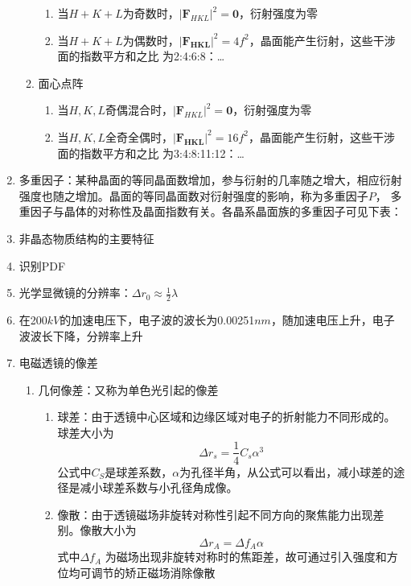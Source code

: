 \documentclass[12pt,a4paper]{article}
\begin{document}
\begin{enumerate}
\begin{enumerate}
\begin{enumerate}
                    \item 当$H+K+L$为奇数时，$\left|\boldsymbol{F}_{H K L}\right|^{2}=\mathbf{0}$，衍射强度为零
                    \item 当$H+K+L$为偶数时，$\left|\boldsymbol{F}_{\boldsymbol{H K L}}\right|^{2}=4 f^{2}$，晶面能产生衍射，这些干涉面的指数平方和之比
                    为2:4:6:8：\dots
                \end{enumerate}
                \item 面心点阵
                \begin{enumerate}
                    \item 当$H,K,L$奇偶混合时，$\left|\boldsymbol{F}_{H K L}\right|^{2}=\mathbf{0}$，衍射强度为零
                    \item 当$H,K,L$全奇全偶时，$\left|\boldsymbol{F}_{\boldsymbol{H K L}}\right|^{2}=16 f^{2}$，晶面能产生衍射，这些干涉面的指数平方和之比
                    为3:4:8:11:12：\dots
                \end{enumerate}
        \end{enumerate}
        \item 多重因子：某种晶面的等同晶面数增加，参与衍射的几率随之增大，相应衍射强度也随之增加。晶面的等同晶面数对衍射强度的影响，称为多重因子$P$，
        多重因子与晶体的对称性及晶面指数有关。各晶系晶面族的多重因子可见下表：
        \item 非晶态物质结构的主要特征
        \item 识别PDF
        \item 光学显微镜的分辨率：$\Delta r_{0} \approx \frac{1}{2} \lambda$
        \item 在200$kV$的加速电压下，电子波的波长为0.00251$nm$，随加速电压上升，电子波波长下降，分辨率上升
        \item 电磁透镜的像差
        \begin{enumerate}
            \item 几何像差：又称为单色光引起的像差
            \begin{enumerate}
                \item 球差：由于透镜中心区域和边缘区域对电子的折射能力不同形成的。球差大小为$$\Delta r_{s}=\frac{1}{4} C_{s} \alpha^{3}$$
                公式中$C_{S}$是球差系数，$\alpha$为孔径半角，从公式可以看出，减小球差的途径是减小球差系数与小孔径角成像。
                \item 像散：由于透镜磁场非旋转对称性引起不同方向的聚焦能力出现差别。像散大小为$$\Delta r_{A}=\Delta f_{A} \alpha$$式中$\Delta f_{A}$
                为磁场出现非旋转对称时的焦距差，故可通过引入强度和方位均可调节的矫正磁场消除像散

\end{enumerate}
\end{enumerate}
\end{enumerate}
\end{document}
